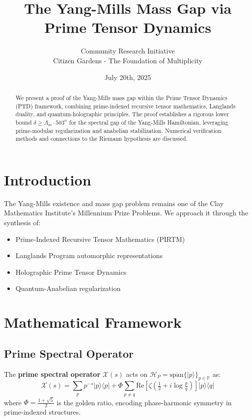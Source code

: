 \documentclass[11pt]{article}
\title{The Yang-Mills Mass Gap via Prime Tensor Dynamics}
\author{Community Research Initiative \\ Citizen Gardens - The Foundation of Multiplicity}
\date{July 20th, 2025}
\theoremstyle{plain}
\begin{document}
\maketitle

\begin{abstract}
We present a proof of the Yang-Mills mass gap within the Prime Tensor Dynamics (PTD) framework, combining prime-indexed recursive tensor mathematics, Langlands duality, and quantum-holographic principles. The proof establishes a rigorous lower bound $\delta \geq \Lambda_m \cdot 503^\alpha$ for the spectral gap of the Yang-Mills Hamiltonian, leveraging prime-modular regularization and anabelian stabilization. Numerical verification methods and connections to the Riemann hypothesis are discussed.
\end{abstract}

\section{Introduction}

The Yang-Mills existence and mass gap problem remains one of the Clay Mathematics Institute's Millennium Prize Problems. We approach it through the synthesis of:

\begin{itemize}
\item Prime-Indexed Recursive Tensor Mathematics (PIRTM)
\item Langlands Program automorphic representations
\item Holographic Prime Tensor Dynamics
\item Quantum-Anabelian regularization
\end{itemize}

\section{Mathematical Framework}

\subsection{Prime Spectral Operator}

\begin{definition}
The \textbf{prime spectral operator} $\mathcal{X}(s)$ acts on $\mathcal{H}_P = \overline{\text{span}}\{|p\rangle\}_{p\in\mathbb{P}}$ as:
\begin{equation}
\mathcal{X}(s) = \sum_p p^{-s}|p\rangle\langle p| + \Phi \sum_{p\neq q} \text{Re}\left[\zeta\left(\tfrac{1}{2}+i\log\tfrac{p}{q}\right)\right]|p\rangle\langle q|
\end{equation}
where $\Phi = \frac{1+\sqrt{5}}{2}$ is the golden ratio, encoding phase-harmonic symmetry in prime-indexed structures.
\end{definition}
\end{document}
